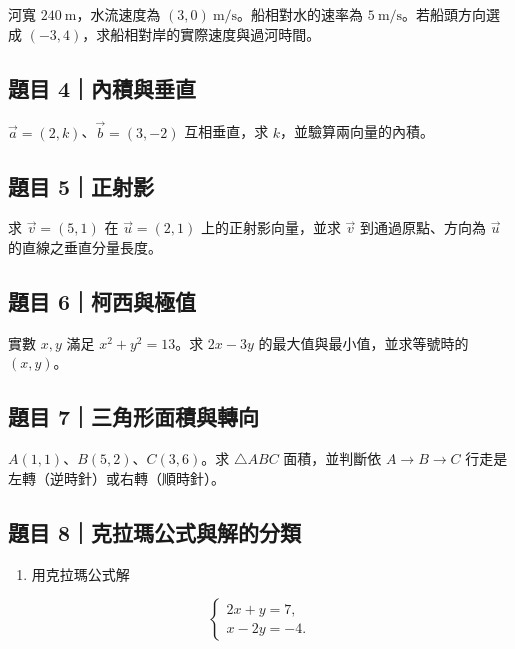 \documentclass[11pt,a4paper]{article}
\providecommand{\tightlist}{%
  \setlength{\itemsep}{0pt}\setlength{\parskip}{0pt}}
\begin{document}
河寬 \(240\ \mathrm m\)，水流速度為 \((3,0)\ \mathrm{m/s}\)。船相對水的速率為 \(5\ \mathrm{m/s}\)。若船頭方向選成 \((-3,4)\)，求船相對岸的實際速度與過河時間。

\subsection{題目 4｜內積與垂直}\label{ux984cux76ee-4ux5167ux7a4dux8207ux5782ux76f4}

\(\vec a=(2,k)\)、\(\vec b=(3,-2)\) 互相垂直，求 \(k\)，並驗算兩向量的內積。

\subsection{題目 5｜正射影}\label{ux984cux76ee-5ux6b63ux5c04ux5f71}

求 \(\vec v=(5,1)\) 在 \(\vec u=(2,1)\) 上的正射影向量，並求 \(\vec v\) 到通過原點、方向為 \(\vec u\) 的直線之垂直分量長度。

\subsection{題目 6｜柯西與極值}\label{ux984cux76ee-6ux67efux897fux8207ux6975ux503c}

實數 \(x,y\) 滿足 \(x^2+y^2=13\)。求 \(2x-3y\) 的最大值與最小值，並求等號時的 \((x,y)\)。

\subsection{題目 7｜三角形面積與轉向}\label{ux984cux76ee-7ux4e09ux89d2ux5f62ux9762ux7a4dux8207ux8f49ux5411}

\(A(1,1)\)、\(B(5,2)\)、\(C(3,6)\)。求 \(\triangle ABC\) 面積，並判斷依 \(A\to B\to C\) 行走是左轉（逆時針）或右轉（順時針）。

\subsection{題目 8｜克拉瑪公式與解的分類}\label{ux984cux76ee-8ux514bux62c9ux746aux516cux5f0fux8207ux89e3ux7684ux5206ux985e}

\begin{enumerate}
\def\labelenumi{\arabic{enumi}.}
\tightlist
\item
  用克拉瑪公式解
\end{enumerate}

\[
\begin{cases}
2x+y=7,\\
x-2y=-4.
\end{cases}
\]
\end{document}
